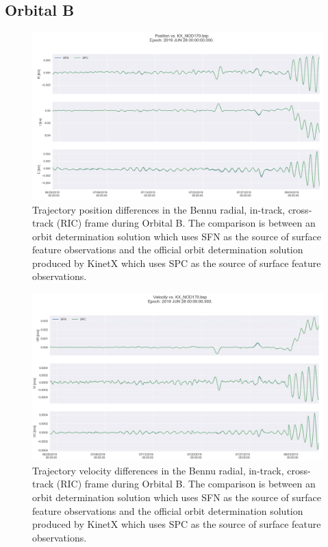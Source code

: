 \documentclass{src/RPI-SIW}
\begin{document}
\subsection*{Orbital B}
\begin{figure}[h]
	\centering
	\includegraphics[width=\columnwidth]{orbitb_pfig.png}
    \caption{Trajectory position differences in the Bennu radial, in-track, cross-track (RIC) frame during Orbital B.  The comparison is between an orbit determination solution which uses SFN as the source of surface feature observations and the official orbit determination solution produced by KinetX which uses SPC as the source of surface feature observations.}
    \label{fig:obpos}
\end{figure}
\begin{figure}[h]
	\centering
	\includegraphics[width=\columnwidth]{orbitb_vfig.png}
    \caption{Trajectory velocity differences in the Bennu radial, in-track, cross-track (RIC) frame during Orbital B.  The comparison is between an orbit determination solution which uses SFN as the source of surface feature observations and the official orbit determination solution produced by KinetX which uses SPC as the source of surface feature observations.}
    \label{fig:obvel}
\end{figure}
\end{document}
